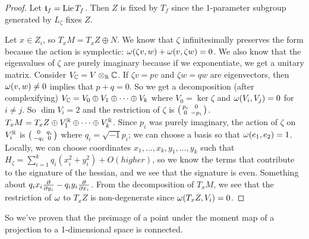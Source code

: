 \begin{proof}
 Let $\mathfrak{t}_f=\operatorname{Lie} T_f$. Then $Z$ is fixed by $T_f$ since the 1-parameter subgroup generated by $L_\zeta$ fixes $Z$.
 
 Let $x\in Z_i$, so $T_xM=T_xZ\oplus N$. We know that $\zeta$ infinitesimally preserves the form because the action is symplectic: $\omega(\zeta v,w)+\omega(v,\zeta w)=0$. We also know that the eigenvalues of $\zeta$ are purely imaginary because if we exponentiate, we get a unitary matrix. Consider $V_{\mathbb{C}}=V\otimes_{\mathbb{R}} \mathbb{C}$. If $\zeta v=pv$ and $\zeta w=qw$ are eigenvectors, then $\omega(v,w)\neq 0$ implies that $p+q= 0$. So we get a decomposition (after complexifying) $V_{\mathbb{C}} = V_0\oplus V_1 \oplus \cdots \oplus V_k$ where $V_0=\ker \zeta$ and $\omega(V_i,V_j)=0$ for $i\neq j$. So $\dim V_i=2$ and the restriction of $\zeta$ is $\bigl(\begin{smallmatrix} p_i&0\\ 0&-p_i \end{smallmatrix}\bigr)$. $T_x M=T_x Z\oplus V_1^{\mathbb{R}}\oplus \cdots \oplus V_k^{\mathbb{R}}$. Since $p_i$ was purely imaginary, the action of $\zeta$ on $V_i^{\mathbb{R}}$ is $\bigl(\begin{smallmatrix} 0& q_i\\ -q_i&0 \end{smallmatrix}\bigr)$ where $q_i=\sqrt{-1}p_i$; we can choose a basis so that $\omega(e_1,e_2)=1$. Locally, we can choose coordinates $x_1,\dots, x_k, y_1,\dots, y_k$ such that $H_\zeta = \sum_{i=1}^k q_i (x_i^2+y_i^2)+O(higher)$, so we know the terms that contribute to the signature of the hessian, and we see that the signature is even. Something about $q_i x_i\frac{\partial }{\partial y_i}-q_iy_i\frac{\partial }{\partial x_i}$. From the decomposition of $T_x M$, we see that the restriction of $\omega$ to $T_x Z$ is non-degenerate since $\omega(T_x Z,V_i)=0$.
\end{proof}
So we've proven that the preimage of a point under the moment map of a projection to a 1-dimensional space is connected.

